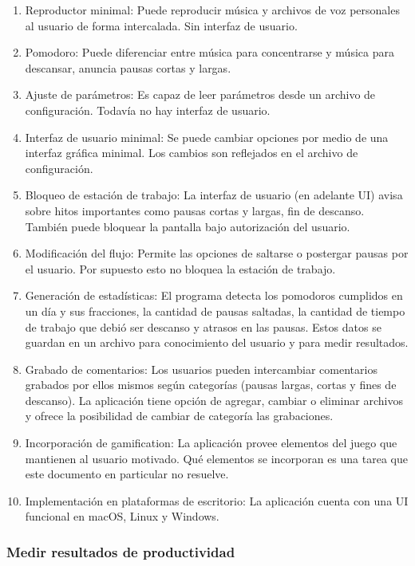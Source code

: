 \documentclass[12pt,letterpaper]{report}
\providecommand{\tightlist}{%
  \setlength{\itemsep}{0pt}\setlength{\parskip}{0pt}}
\begin{document}
\begin{enumerate}
\tightlist
\item
  Reproductor minimal: Puede reproducir música y archivos de voz
  personales al usuario de forma intercalada. Sin interfaz de usuario.
\item
  Pomodoro: Puede diferenciar entre música para concentrarse y música
  para descansar, anuncia pausas cortas y largas.
\item
  Ajuste de parámetros: Es capaz de leer parámetros desde un archivo de
  configuración. Todavía no hay interfaz de usuario.
\item
  Interfaz de usuario minimal: Se puede cambiar opciones por medio de
  una interfaz gráfica minimal. Los cambios son reflejados en el archivo
  de configuración.
\item
  Bloqueo de estación de trabajo: La interfaz de usuario (en adelante
  UI) avisa sobre hitos importantes como pausas cortas y largas, fin de
  descanso. También puede bloquear la pantalla bajo autorización del
  usuario.
\item
  Modificación del flujo: Permite las opciones de saltarse o postergar
  pausas por el usuario. Por supuesto esto no bloquea la estación de
  trabajo.
\item
  Generación de estadísticas: El programa detecta los pomodoros
  cumplidos en un día y sus fracciones, la cantidad de pausas saltadas,
  la cantidad de tiempo de trabajo que debió ser descanso y atrasos en
  las pausas. Estos datos se guardan en un archivo para conocimiento del
  usuario y para medir resultados.
\item
  Grabado de comentarios: Los usuarios pueden intercambiar comentarios
  grabados por ellos mismos según categorías (pausas largas, cortas y
  fines de descanso). La aplicación tiene opción de agregar, cambiar o
  eliminar archivos y ofrece la posibilidad de cambiar de categoría las
  grabaciones.
\item
  Incorporación de gamification: La aplicación provee elementos del
  juego que mantienen al usuario motivado. Qué elementos se incorporan
  es una tarea que este documento en particular no resuelve.
\item
  Implementación en plataformas de escritorio: La aplicación cuenta con
  una UI funcional en macOS, Linux y Windows.
\end{enumerate}

\hypertarget{medir-resultados-de-productividad}{%
\subsubsection{Medir resultados de
productividad}\label{medir-resultados-de-productividad}}
\end{document}
